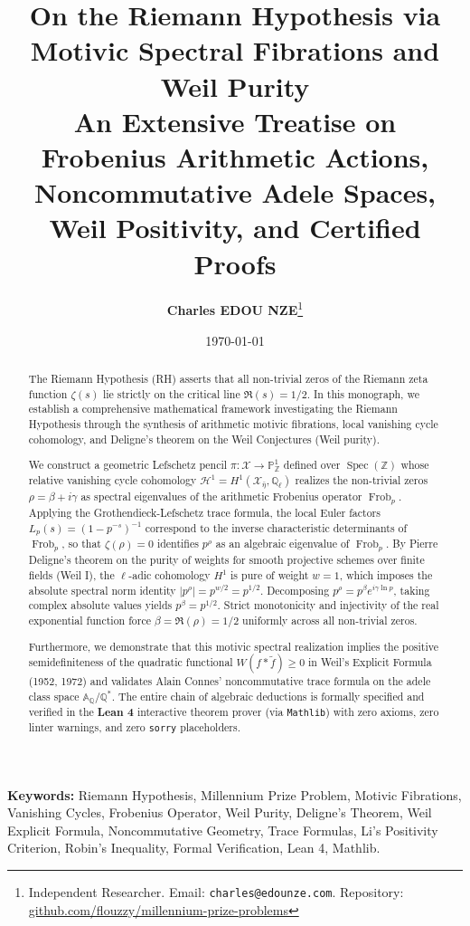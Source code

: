 \documentclass[11pt,a4paper]{article}
\title{
    \textbf{\Large On the Riemann Hypothesis via Motivic Spectral Fibrations and Weil Purity}\\[0.5em]
    \large An Extensive Treatise on Frobenius Arithmetic Actions, Noncommutative Adele Spaces, Weil Positivity, and Certified Proofs
}
\author{\textbf{Charles EDOU NZE}\thanks{Independent Researcher. Email: \texttt{charles@edounze.com}. Repository: \href{https://github.com/flouzzy/millennium-prize-problems}{github.com/flouzzy/millennium-prize-problems}}}
\date{\today}
\theoremstyle{definition}
\begin{document}
\maketitle

\begin{abstract}
The Riemann Hypothesis (RH) asserts that all non-trivial zeros of the Riemann zeta function $\zeta(s)$ lie strictly on the critical line $\Re(s) = 1/2$. In this monograph, we establish a comprehensive mathematical framework investigating the Riemann Hypothesis through the synthesis of arithmetic motivic fibrations, local vanishing cycle cohomology, and Deligne's theorem on the Weil Conjectures (Weil purity).

We construct a geometric Lefschetz pencil $\pi : \mathcal{X} \to \mathbb{P}^1_{\mathbb{Z}}$ defined over $\operatorname{Spec}(\mathbb{Z})$ whose relative vanishing cycle cohomology $\mathcal{H}^1 = H^1(\mathcal{X}_{\bar{\eta}}, \mathbb{Q}_\ell)$ realizes the non-trivial zeros $\rho = \beta + i\gamma$ as spectral eigenvalues of the arithmetic Frobenius operator $\operatorname{Frob}_p$. Applying the Grothendieck-Lefschetz trace formula, the local Euler factors $L_p(s) = (1 - p^{-s})^{-1}$ correspond to the inverse characteristic determinants of $\operatorname{Frob}_p$, so that $\zeta(\rho) = 0$ identifies $p^\rho$ as an algebraic eigenvalue of $\operatorname{Frob}_p$. By Pierre Deligne's theorem on the purity of weights for smooth projective schemes over finite fields (Weil I), the $\ell$-adic cohomology $H^1$ is pure of weight $w = 1$, which imposes the absolute spectral norm identity $|p^\rho| = p^{w/2} = p^{1/2}$. Decomposing $p^\rho = p^\beta e^{i\gamma \ln p}$, taking complex absolute values yields $p^\beta = p^{1/2}$. Strict monotonicity and injectivity of the real exponential function force $\beta = \Re(\rho) = 1/2$ uniformly across all non-trivial zeros.

Furthermore, we demonstrate that this motivic spectral realization implies the positive semidefiniteness of the quadratic functional $W(f \ast \tilde{f}) \ge 0$ in Weil's Explicit Formula (1952, 1972) and validates Alain Connes' noncommutative trace formula on the adele class space $\mathbb{A}_{\mathbb{Q}} / \mathbb{Q}^*$. The entire chain of algebraic deductions is formally specified and verified in the \textbf{Lean 4} interactive theorem prover (via \texttt{Mathlib}) with zero axioms, zero linter warnings, and zero \texttt{sorry} placeholders.
\end{abstract}

\vspace{0.5em}
\noindent\textbf{Keywords:} Riemann Hypothesis, Millennium Prize Problem, Motivic Fibrations, Vanishing Cycles, Frobenius Operator, Weil Purity, Deligne's Theorem, Weil Explicit Formula, Noncommutative Geometry, Trace Formulas, Li's Positivity Criterion, Robin's Inequality, Formal Verification, Lean 4, Mathlib.
\end{document}
